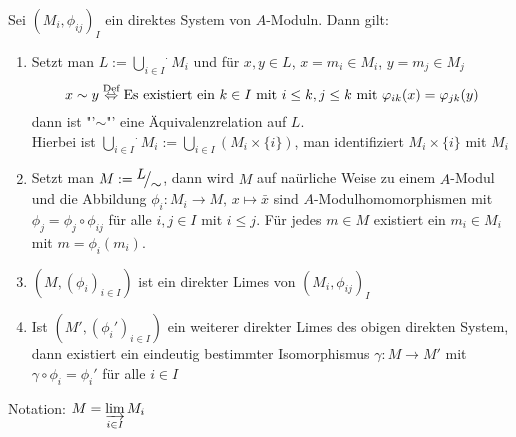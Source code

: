 \begin{sa}\label{16.6}
	Sei $(M_i, \phi_{ij})_I$ ein direktes System von $A$-Moduln. Dann gilt:
	\begin{enumerate}[label= \alph*)]
		\item Setzt man $L:= \overset{.}{\bigcup\limits_{i\in I}} M_i$ und für $x,y\in L$, $x= m_i \in M_i$, $y= m_j \in M_j$ 
		$$x\sim y \overset{\text{Def}}{\Leftrightarrow} \text{Es existiert ein }k\in I \text{ mit } i\leq k, j \leq k \text{ mit } \varphi_{ik}(x) = \varphi_{jk}(y)$$
		dann ist "'$\sim$"' eine Äquivalenzrelation auf $L$.  \\
		Hierbei ist $\overset{.}{\bigcup\limits_{i\in I}} M_i:= \bigcup_{i\in I}(M_i \times \{i\})$, man identifiziert $M_i\times \{i\}$ mit $M_i$
		\item Setzt man $M:= \QR{L}{\sim}$, dann wird $M$ auf naürliche Weise zu einem $A$-Modul und die Abbildung $\phi_i : M_i \to M, \, x \mapsto \bar x$ sind $A$-Modulhomomorphismen mit $\phi_j = \phi_j \circ \phi_{ij}$ für alle $i,j\in I $ mit $i\leq j$. Für jedes $m\in M$ existiert ein $m_i \in M_i$ mit $m= \phi_i(m_i)$.
		\item $(M,(\phi_i)_{i\in I})$ ist ein direkter Limes von $(M_i, \phi_{ij})_I$
		\item Ist $(M', (\phi_i')_{i\in I})$ ein weiterer direkter Limes des obigen direkten System, dann existiert ein eindeutig bestimmter Isomorphismus $\gamma:M \to M'$ mit $\gamma \circ \phi_i = \phi_i'$ für alle $i\in I$
	\end{enumerate}
Notation: $M = \varinjlim\limits_{i\in I} M_i$
\end{sa}

